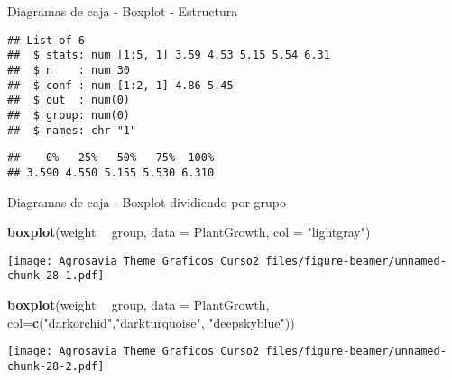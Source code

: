 \documentclass[ignorenonframetext,]{beamer}
\newenvironment{Shaded}{\begin{snugshade}}{\end{snugshade}}
\newcommand{\KeywordTok}[1]{\textcolor[rgb]{0.13,0.29,0.53}{\textbf{#1}}}
\newcommand{\DataTypeTok}[1]{\textcolor[rgb]{0.13,0.29,0.53}{#1}}
\newcommand{\DecValTok}[1]{\textcolor[rgb]{0.00,0.00,0.81}{#1}}
\newcommand{\FloatTok}[1]{\textcolor[rgb]{0.00,0.00,0.81}{#1}}
\newcommand{\StringTok}[1]{\textcolor[rgb]{0.31,0.60,0.02}{#1}}
\newcommand{\OtherTok}[1]{\textcolor[rgb]{0.56,0.35,0.01}{#1}}
\newcommand{\OperatorTok}[1]{\textcolor[rgb]{0.81,0.36,0.00}{\textbf{#1}}}
\newcommand{\NormalTok}[1]{#1}
\begin{document}
\begin{frame}[fragile]{Diagramas de caja - Boxplot - Estructura}

\begin{Shaded}
\end{Shaded}

\begin{verbatim}
## List of 6
##  $ stats: num [1:5, 1] 3.59 4.53 5.15 5.54 6.31
##  $ n    : num 30
##  $ conf : num [1:2, 1] 4.86 5.45
##  $ out  : num(0) 
##  $ group: num(0) 
##  $ names: chr "1"
\end{verbatim}

\begin{Shaded}
\end{Shaded}

\begin{verbatim}
##    0%   25%   50%   75%  100% 
## 3.590 4.550 5.155 5.530 6.310
\end{verbatim}

\end{frame}

\begin{frame}[fragile]{Diagramas de caja - Boxplot dividiendo por grupo}

\begin{Shaded}
\begin{Highlighting}[]
\KeywordTok{boxplot}\NormalTok{(weight }\OperatorTok{~}\StringTok{ }\NormalTok{group, }\DataTypeTok{data =}\NormalTok{ PlantGrowth, }\DataTypeTok{col =} \StringTok{"lightgray"}\NormalTok{)}
\end{Highlighting}
\end{Shaded}

\texttt{[image: Agrosavia\_Theme\_Graficos\_Curso2\_files/figure-beamer/unnamed-chunk-28-1.pdf]}

\begin{Shaded}
\begin{Highlighting}[]
\KeywordTok{boxplot}\NormalTok{(weight }\OperatorTok{~}\StringTok{ }\NormalTok{group, }\DataTypeTok{data =}\NormalTok{ PlantGrowth, }\DataTypeTok{col=}\KeywordTok{c}\NormalTok{(}\StringTok{"darkorchid"}\NormalTok{,}\StringTok{"darkturquoise"}\NormalTok{,}
                                                  \StringTok{"deepskyblue"}\NormalTok{))}
\end{Highlighting}
\end{Shaded}

\texttt{[image: Agrosavia\_Theme\_Graficos\_Curso2\_files/figure-beamer/unnamed-chunk-28-2.pdf]}

\end{frame}
\end{document}
